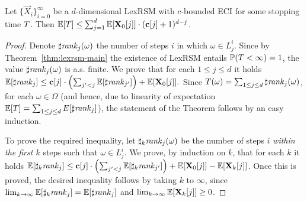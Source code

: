 \begin{theorem}
\label{thm:runtime-bound}
Let $\{\vec{X}_{i}\}_{i=0}^{\infty}$ be a 
$d$-dimensional LexRSM with $c$-bounded ECI for some stopping time $T$. 
Then $\mathbb{E}[T]\leq  
\sum_{j=1}^{d}\mathbb{E}[\mathbf{X}_{0}[j]]\cdot(\mathbf{c}[j]+1)^{d-j}$.
\end{theorem}
\begin{proof}
Denote $\sharp\mathit{rank}_j(\omega)$ the number of steps $i$ in which $\omega\in 
L_j^i$. Since by Theorem~\ref{thm:lexrsm-main} the existence of LexRSM entails 
$\mathbb{P}(T<\infty)=1$, the value $\sharp\mathit{rank}_j(\omega)$ is a.s. finite. 
We prove that for each $1\leq j \leq d$ it holds $\mathbb{E}[\sharp\mathit{rank}_j]\leq 
\mathbf{c}[j]\cdot\left(\sum_{j'<j}\mathbb{E}[\sharp\mathit{rank}_{j'}]\right) + 
\mathbb{E}[\mathbf{X}_{0}[j]].$ Since $T(\omega)=\sum_{1\leq j \leq d} 
\sharp\mathit{rank}_j(\omega)$, for each $\omega\in \Omega$ (and hence, due to 
linearity of expectation $\mathbb{E}[T]=\sum_{1\leq j \leq d} 
E[\sharp\mathit{rank}_j]$), the statement of the 
Theorem follows by an easy induction. 

To prove the required inequality, let $\sharp_{k}\mathit{rank}_{j}(\omega)$ be the number 
of steps $i$ \emph{within the first $k$} steps such that $\omega\in L_j^i$. We 
prove, by induction on $k$, that for each $k$ it holds 
$\mathbb{E}[\sharp_{k}\mathit{rank}_{j}]\leq 
\mathbf{c}[j]\cdot\left(\sum_{j'<j}\mathbb{E}[\sharp_{k}\mathit{rank}_{j'}] \right)+ 
\mathbb{E}[\mathbf{X}_{0}[j]] - \mathbb{E}[\mathbf{X}_{k}[j]]$. Once this is proved, the 
desired inequality follows by taking $k$ to $\infty$, since 
$\lim_{k\rightarrow \infty}\mathbb{E}[\sharp_{k}\mathit{rank}_{j}] = \mathbb{E}[\sharp\mathit{rank}_j]$ and 
$\lim_{k\rightarrow \infty}\mathbb{E}[\mathbf{X}_{k}[j]] \geq 0$.


\end{proof}
